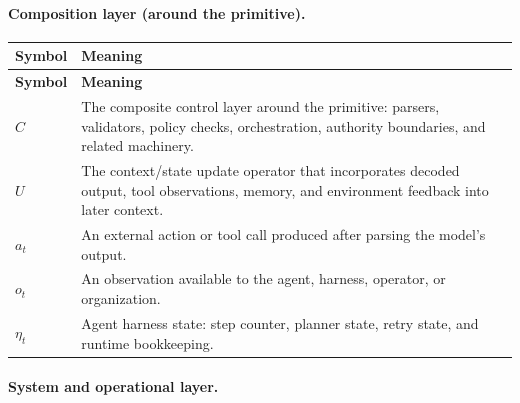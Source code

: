 \documentclass[11pt]{article}
\begin{document}
\paragraph{Composition layer (around the primitive).}

\begin{small}
\begin{longtable}{>{\raggedright\arraybackslash}p{2.2cm}>{\raggedright\arraybackslash}p{12.5cm}}
\toprule
\textbf{Symbol} & \textbf{Meaning} \\
\midrule
\endfirsthead
\toprule
\textbf{Symbol} & \textbf{Meaning} \\
\midrule
\endhead
$C$        & The composite control layer around the primitive: parsers, validators, policy checks, orchestration, authority boundaries, and related machinery. \\
$U$        & The context/state update operator that incorporates decoded output, tool observations, memory, and environment feedback into later context. \\
$a_t$      & An external action or tool call produced after parsing the model's output. \\
$o_t$      & An observation available to the agent, harness, operator, or organization. \\
$\eta_t$   & Agent harness state: step counter, planner state, retry state, and runtime bookkeeping. \\
\bottomrule
\end{longtable}
\end{small}

\paragraph{System and operational layer.}
\end{document}
